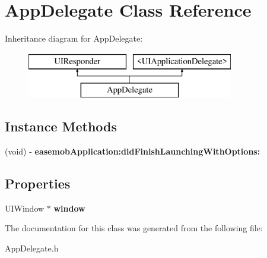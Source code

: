 \hypertarget{interface_app_delegate}{}\section{App\+Delegate Class Reference}
\label{interface_app_delegate}
Inheritance diagram for App\+Delegate\+:\begin{figure}[H]
\begin{center}
\leavevmode
\includegraphics[height=2.000000cm]{interface_app_delegate}
\end{center}
\end{figure}
\subsection*{Instance Methods}
\begin{DoxyCompactItemize}
\item 
\hypertarget{interface_app_delegate_ae72eb8c4bc0a5bcfba6f2399bbc31fbe}{}(void) -\/ {\bfseries easemob\+Application\+:did\+Finish\+Launching\+With\+Options\+:}\label{interface_app_delegate_ae72eb8c4bc0a5bcfba6f2399bbc31fbe}

\end{DoxyCompactItemize}
\subsection*{Properties}
\begin{DoxyCompactItemize}
\item 
\hypertarget{interface_app_delegate_acf48ac24125e688cac1a85445cd7fac2}{}U\+I\+Window $\ast$ {\bfseries window}\label{interface_app_delegate_acf48ac24125e688cac1a85445cd7fac2}

\end{DoxyCompactItemize}


The documentation for this class was generated from the following file\+:\begin{DoxyCompactItemize}
\item 
App\+Delegate.\+h\end{DoxyCompactItemize}
